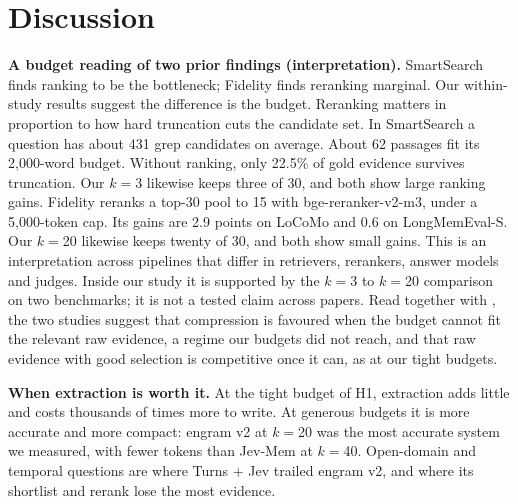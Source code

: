 \documentclass[11pt]{article}
\newcommand{\src}[1]{}
\begin{document}
\section{Discussion}\label{sec:6}
\textbf{A budget reading of two prior findings (interpretation).} SmartSearch finds ranking to be the bottleneck; Fidelity finds reranking marginal. Our within-study results suggest the difference is the budget. Reranking matters in proportion to how hard truncation cuts the candidate set. In SmartSearch a question has about 431\src{cite:derehag2026smartsearch (checked against the paper's text; paper\_v3/bib\_verification.md)} grep candidates on average. About 62\src{cite:derehag2026smartsearch (checked against the paper's text; paper\_v3/bib\_verification.md)} passages fit its 2,000\src{cite:derehag2026smartsearch (checked against the paper's text; paper\_v3/bib\_verification.md)}-word budget. Without ranking, only 22.5\src{cite:derehag2026smartsearch (checked against the paper's text; paper\_v3/bib\_verification.md)}\% of gold evidence survives truncation. Our $k{=}$3 likewise keeps three of 30\src{docs/V3\_PLAN.md §1, §2, §4}, and both show large ranking gains. Fidelity reranks a top-30\src{cite:an2026fidelity (checked against the paper's text; paper\_v3/bib\_verification.md)} pool to 15\src{cite:an2026fidelity (checked against the paper's text; paper\_v3/bib\_verification.md)} with bge-reranker-v2-m3, under a 5,000\src{cite:an2026fidelity (checked against the paper's text; paper\_v3/bib\_verification.md)}-token cap. Its gains are 2.9\src{cite:an2026fidelity (checked against the paper's text; paper\_v3/bib\_verification.md)} points on LoCoMo and 0.6\src{cite:an2026fidelity (checked against the paper's text; paper\_v3/bib\_verification.md)} on LongMemEval-S. Our $k{=}$20 likewise keeps twenty of 30\src{docs/V3\_PLAN.md §1, §2, §4}, and both show small gains. This is an interpretation across pipelines that differ in retrievers, rerankers, answer models and judges. Inside our study it is supported by the $k{=}$3 to $k{=}$20 comparison on two benchmarks; it is not a tested claim across papers. Read together with \citet{kang2026retain}, the two studies suggest that compression is favoured when the budget cannot fit the relevant raw evidence, a regime our budgets did not reach, and that raw evidence with good selection is competitive once it can, as at our tight budgets.

\textbf{When extraction is worth it.} At the tight budget of H1, extraction adds little and costs thousands of times more to write. At generous budgets it is more accurate and more compact: engram v2 at $k{=}$20 was the most accurate system we measured, with fewer tokens than Jev-Mem at $k{=}$40. Open-domain and temporal questions are where Turns + Jev trailed engram v2, and where its shortlist and rerank lose the most evidence.
\end{document}

